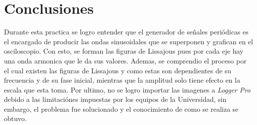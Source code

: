 \documentclass[a4paper, amsfonts, amssymb, amsmath, reprint, showkeys, nofootinbib, twoside]{revtex4-1}
\begin{document}
\section{Conclusiones}

Durante esta practica se logro entender que el generador de señales periódicas es el encargado de producir las ondas sinusoidales que se superponen y grafican en el osciloscopio. Con esto, se forman las figuras de Lissajous pues por cada eje hay una onda armonica que le da sus valores. Ademas, se comprendio el proceso por el cual existen las figuras de Lissajous y como estas son dependientes de su frecuencia y de su fase inicial, mientras que la amplitud solo tiene efecto en la escala que esta toma. Por ultimo, no se logro importar las imagenes a \textit{Logger Pro} debido a las limitaciónes impuestas por los equipos de la Universidad, sin embargo, el problema fue solucionado y el conocimiento de como se realiza se obtuvo.




\end{document}
